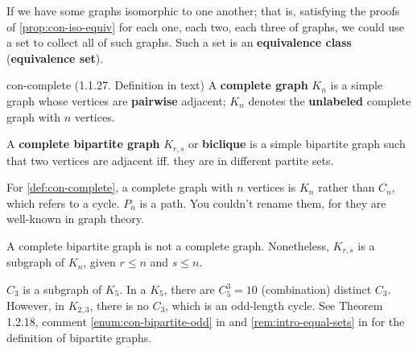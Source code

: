\documentclass[../src/handouts/main.tex]{subfiles}
\begin{document}
If we have some graphs isomorphic to one another; that is, satisfying the proofs of \cref{prop:con-iso-equiv} for each one, each two, each three of graphs, we could use a set to collect all of such graphs. Such a set is an \textbf{equivalence class} (\textbf{equivalence set}). 

\begin{definition}{}{con-complete}
  (1.1.27. Definition in text)
  A \textbf{complete graph} $K_n$ is a simple graph whose vertices are \textbf{pairwise} adjacent; $K_n$ denotes the \textbf{unlabeled} complete graph with $n$ vertices.

  A \textbf{complete bipartite graph} $K_{r,s}$ or \textbf{biclique} is a simple bipartite graph such that two vertices are adjacent iff. they are in different partite sets.
\end{definition}

For \cref{def:con-complete}, a complete graph with $n$ vertices is $K_n$ rather than $C_n$, which refers to a cycle. $P_n$ is a path. You couldn't rename them, for they are well-known in graph theory.

A complete bipartite graph is not a complete graph. Nonetheless, $K_{r,s}$ is a subgraph of $K_n$, given $r \leq n$ and $s \leq n$.

$C_3$ is a subgraph of $K_5$. In a $K_5$, there are $C_5^3 = 10$ (combination) distinct $C_3$. However, in $K_{2,3}$, there is no $C_3$, which is an odd-length cycle. See Theorem 1.2.18, comment \ref{enum:con-bipartite-odd} in  and \cref{rem:intro-equal-sets} in  for the definition of bipartite graphs. %
\end{document}
